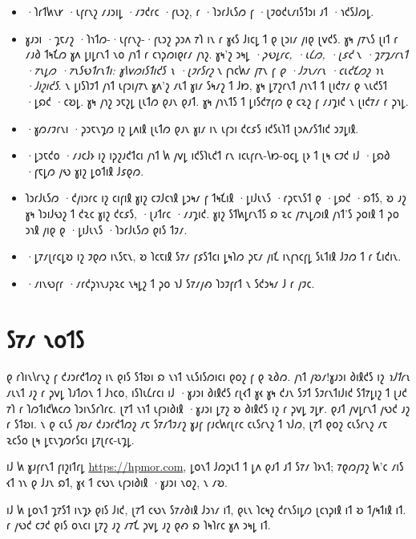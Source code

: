 \begin{itemize}
\item \textsc{·𐑐𐑩𐑑𐑿𐑯𐑾 ·𐑧𐑝𐑩𐑯𐑟} 𐑥𐑨𐑮𐑦𐑛 ·𐑥𐑲𐑒𐑩𐑤 ·𐑝𐑧𐑮𐑟, 𐑩 ·𐑐𐑮𐑩𐑓𐑧𐑕𐑼 𐑝 ·𐑚𐑲𐑴𐑒𐑧𐑥𐑦𐑕𐑑𐑮𐑦 𐑨𐑑 ·𐑪𐑒𐑕𐑓𐑼𐑛.
\item \textsc{𐑣𐑨𐑮𐑦 ·𐑡𐑱𐑥𐑟 ·𐑐𐑪𐑑𐑼-·𐑧𐑝𐑩𐑯𐑟-·𐑝𐑧𐑮𐑟} 𐑜𐑮𐑵 𐑳𐑐 𐑦𐑯 𐑩 𐑣𐑬𐑕 𐑓𐑦𐑤𐑛 𐑑 𐑞 𐑚𐑮𐑦𐑥 𐑢𐑦𐑞 𐑚𐑫𐑒𐑕. 𐑣𐑰 𐑢𐑳𐑯𐑕 𐑚𐑦𐑑 𐑩 𐑥𐑨𐑔 𐑑𐑰𐑗𐑼 𐑣𐑵 𐑛𐑦𐑛𐑩𐑯𐑑 𐑯𐑴 𐑢𐑪𐑑 𐑩 𐑤𐑪𐑜𐑼𐑦𐑞𐑩𐑥 𐑢𐑪𐑟. 𐑣𐑰'𐑟 𐑮𐑰𐑛 \emph{·𐑜𐑻︀𐑛𐑩𐑤, ·𐑧𐑖𐑼, ·𐑚𐑭𐑒} 𐑯 \emph{·𐑡𐑳𐑡𐑥𐑩𐑯𐑑 ·𐑳𐑯𐑛𐑼 ·𐑳𐑯𐑕𐑻𐑑𐑩𐑯𐑑𐑦: 𐑣𐑘𐑫𐑼𐑦𐑕𐑑𐑦𐑒𐑕 𐑯 ·𐑚𐑲𐑩𐑕𐑩𐑟} 𐑯 𐑝𐑪𐑤𐑿𐑥 𐑢𐑳𐑯 𐑝 \emph{𐑞 ·𐑓𐑲𐑯𐑥𐑩𐑯 ·𐑤𐑧𐑒𐑗𐑼𐑟 𐑪𐑯 ·𐑓𐑦𐑟𐑦𐑒𐑕}. 𐑯 𐑛𐑦𐑕𐑐𐑲𐑑 𐑢𐑪𐑑 𐑧𐑝𐑮𐑦𐑢𐑳𐑯 𐑣𐑵'𐑟 𐑥𐑧𐑑 𐑣𐑦𐑥 𐑕𐑰𐑥𐑟 𐑑 𐑓𐑽, 𐑣𐑰 𐑛𐑳𐑟𐑩𐑯𐑑 𐑢𐑪𐑯𐑑 𐑑 𐑚𐑦𐑒𐑳𐑥 𐑞 𐑯𐑧𐑒𐑕𐑑 ·𐑛𐑸𐑒 ·𐑤𐑹𐑛. 𐑣𐑰 𐑢𐑪𐑟 𐑮𐑱𐑟𐑛 𐑚𐑧𐑑𐑼 𐑞𐑨𐑯 𐑞𐑨𐑑. 𐑣𐑰 𐑢𐑪𐑯𐑑𐑕 𐑑 𐑛𐑦𐑕𐑒𐑳𐑝𐑼 𐑞 𐑤𐑷𐑟 𐑝 𐑥𐑨𐑡𐑦𐑒 𐑯 𐑚𐑦𐑒𐑳𐑥 𐑩 𐑜𐑪𐑛.
\item \textsc{·𐑣𐑼𐑥𐑲𐑩𐑯𐑦 ·𐑜𐑮𐑱𐑯𐑡𐑼} 𐑦𐑟 𐑛𐑵𐑦𐑙 𐑚𐑧𐑑𐑼 𐑞𐑨𐑯 𐑣𐑦𐑥 𐑦𐑯 𐑧𐑝𐑮𐑦 𐑒𐑤𐑭𐑕 𐑦𐑒𐑕𐑧𐑐𐑑 𐑚𐑮𐑵𐑥𐑕𐑑𐑦𐑒 𐑮𐑲𐑛𐑦𐑙.
\item \textsc{·𐑛𐑮𐑱𐑒𐑴 ·𐑥𐑨𐑤𐑓𐑶} 𐑦𐑟 𐑦𐑜𐑟𐑨𐑒𐑑𐑤𐑦 𐑢𐑪𐑑 𐑿 𐑢𐑫𐑛 𐑦𐑒𐑕𐑐𐑧𐑒𐑑 𐑩𐑯 𐑦𐑤𐑧𐑝𐑩𐑯-𐑘𐑽-𐑴𐑤𐑛 𐑚𐑶 𐑑 𐑚𐑰 𐑤𐑲𐑒 𐑦𐑓 ·𐑛𐑸𐑔 ·𐑝𐑱𐑛𐑼 𐑢𐑻 𐑣𐑦𐑟 𐑛𐑴𐑑𐑦𐑙 𐑓𐑭𐑞𐑼.
\item \textsc{𐑐𐑮𐑩𐑓𐑧𐑕𐑼 ·𐑒𐑢𐑦𐑮𐑩𐑤} 𐑦𐑟 𐑤𐑦𐑝𐑦𐑙 𐑣𐑦𐑟 𐑤𐑲𐑓𐑤𐑪𐑙 𐑛𐑮𐑰𐑥 𐑝 𐑑𐑰𐑗𐑦𐑙 ·𐑛𐑦𐑓𐑧𐑯𐑕 ·𐑩𐑜𐑱𐑯𐑕𐑑 𐑞 ·𐑛𐑸𐑒 ·𐑸𐑑𐑕, 𐑹 𐑨𐑟 𐑣𐑰 𐑐𐑮𐑦𐑓𐑻𐑟 𐑑 𐑒𐑷𐑤 𐑣𐑦𐑟 𐑒𐑤𐑭𐑕, ·𐑚𐑨𐑑𐑩𐑤 ·𐑥𐑨𐑡𐑦𐑒. 𐑣𐑦𐑟 𐑕𐑑𐑿𐑛𐑩𐑯𐑑𐑕 𐑸 𐑷𐑤 𐑢𐑳𐑯𐑛𐑼𐑦𐑙 𐑢𐑪𐑑'𐑕 𐑜𐑴𐑦𐑙 𐑑 𐑜𐑴 𐑮𐑪𐑙 𐑢𐑦𐑞 𐑞 ·𐑛𐑦𐑓𐑧𐑯𐑕 ·𐑐𐑮𐑩𐑓𐑧𐑕𐑼 𐑞𐑦𐑕 𐑑𐑲𐑥.
\item \textsc{·𐑛𐑳𐑥𐑚𐑩𐑤𐑛𐑹} 𐑦𐑟 𐑲𐑞𐑼 𐑦𐑯𐑕𐑱𐑯, 𐑹 𐑐𐑤𐑱𐑦𐑙 𐑕𐑳𐑥 𐑝𐑭𐑕𐑑𐑤𐑦 𐑛𐑰𐑐𐑼 𐑜𐑱𐑥 𐑢𐑦𐑗 𐑦𐑯𐑝𐑪𐑤𐑝𐑛 𐑕𐑧𐑑𐑦𐑙 𐑓𐑲𐑼 𐑑 𐑩 𐑗𐑦𐑒𐑦𐑯.
\item \textsc{·𐑥𐑦𐑯𐑻𐑝𐑩 ·𐑥𐑩𐑒𐑜𐑪𐑯𐑨𐑜𐑷𐑤} 𐑯𐑰𐑛𐑟 𐑑 𐑜𐑴 𐑪𐑓 𐑕𐑳𐑥𐑢𐑺 𐑐𐑮𐑲𐑝𐑩𐑑 𐑯 𐑕𐑒𐑮𐑰𐑥 𐑓 𐑩 𐑢𐑲𐑤.
\end{itemize}

%
%

\section*{𐑕𐑳𐑥 𐑯𐑴𐑑𐑕}
𐑞 𐑩𐑐𐑦𐑯𐑘𐑩𐑯𐑟 𐑝 𐑒𐑨𐑮𐑩𐑒𐑑𐑼𐑟 𐑦𐑯 𐑞𐑦𐑕 𐑕𐑑𐑹𐑦 𐑸 𐑯𐑪𐑑 𐑯𐑧𐑕𐑦𐑕𐑼𐑦𐑤𐑦 𐑞𐑴𐑟 𐑝 𐑞 𐑷𐑔𐑼. 𐑢𐑪𐑑 𐑢𐑹𐑥!𐑣𐑨𐑮𐑦 𐑔𐑦𐑙𐑒𐑕 𐑦𐑟 \emph{𐑪𐑓𐑑𐑩𐑯} 𐑥𐑧𐑯𐑑 𐑨𐑟 𐑩 𐑜𐑫𐑛 𐑐𐑨𐑑𐑼𐑯 𐑑 𐑓𐑪𐑤𐑴, 𐑦𐑕𐑐𐑧𐑖𐑩𐑤𐑦 𐑦𐑓 ·𐑣𐑨𐑮𐑦 𐑔𐑦𐑙𐑒𐑕 𐑩𐑚𐑬𐑑 𐑣𐑬 𐑣𐑰 𐑒𐑨𐑯 𐑕𐑲𐑑 𐑕𐑲𐑩𐑯𐑑𐑦𐑓𐑦𐑒 𐑕𐑑𐑳𐑛𐑦𐑟 𐑑 𐑚𐑨𐑒 𐑳𐑐 𐑩 𐑐𐑼𐑑𐑦𐑒𐑿𐑤𐑼 𐑐𐑮𐑦𐑯𐑕𐑩𐑐𐑩𐑤. 𐑚𐑳𐑑 𐑯𐑪𐑑 𐑧𐑝𐑮𐑦𐑔𐑦𐑙 ·𐑣𐑨𐑮𐑦 𐑛𐑳𐑟 𐑹 𐑔𐑦𐑙𐑒𐑕 𐑦𐑟 𐑩 𐑜𐑫𐑛 𐑲𐑛𐑾. 𐑞𐑨𐑑 𐑢𐑫𐑛𐑩𐑯𐑑 𐑢𐑻𐑒 𐑨𐑟 𐑩 𐑕𐑑𐑹𐑦. 𐑯 𐑞 𐑤𐑧𐑕 𐑢𐑹𐑥 𐑒𐑨𐑮𐑩𐑒𐑑𐑼𐑟 𐑥𐑱 𐑕𐑳𐑥𐑑𐑲𐑥𐑟 𐑣𐑨𐑝 𐑝𐑨𐑤𐑿𐑩𐑚𐑩𐑤 𐑤𐑧𐑕𐑩𐑯𐑟 𐑑 𐑪𐑓𐑼, 𐑚𐑳𐑑 𐑞𐑴𐑟 𐑤𐑧𐑕𐑩𐑯𐑟 𐑥𐑱 𐑷𐑤𐑕𐑴 𐑚𐑰 𐑛𐑱𐑯𐑡𐑼𐑩𐑕𐑤𐑦 𐑛𐑳𐑚𐑩𐑤-𐑧𐑡𐑛.

𐑦𐑓 𐑿 𐑣𐑨𐑝𐑩𐑯𐑑 𐑝𐑦𐑟𐑦𐑑𐑩𐑛 \url{https://hpmor.com}, 𐑛𐑴𐑯𐑑 𐑓𐑼𐑜𐑧𐑑 𐑑 𐑛𐑵 𐑞𐑨𐑑 𐑨𐑑 𐑕𐑳𐑥 𐑐𐑶𐑯𐑑; 𐑳𐑞𐑼𐑢𐑲𐑟 𐑿'𐑤 𐑥𐑦𐑕 𐑬𐑑 𐑪𐑯 𐑞 𐑓𐑨𐑯 𐑸𐑑, 𐑣𐑬 𐑑 𐑤𐑻𐑯 𐑧𐑝𐑮𐑦𐑔𐑦𐑙 ·𐑣𐑨𐑮𐑦 𐑯𐑴𐑟, 𐑯 𐑥𐑹.

𐑦𐑓 𐑿 𐑛𐑴𐑯𐑑 𐑡𐑳𐑕𐑑 𐑦𐑯𐑡𐑶 𐑞𐑦𐑕 𐑓𐑦𐑒, 𐑚𐑳𐑑 𐑤𐑻𐑯 𐑕𐑳𐑥𐑔𐑦𐑙 𐑓𐑮𐑪𐑥 𐑦𐑑, 𐑞𐑧𐑯 𐑐𐑤𐑰𐑟 𐑒𐑩𐑯𐑕𐑦𐑛𐑼 𐑚𐑤𐑪𐑜𐑦𐑙 𐑦𐑑 𐑹 𐑑𐑢𐑰𐑑𐑦𐑙 𐑦𐑑. 𐑩 𐑢𐑻𐑒 𐑤𐑲𐑒 𐑞𐑦𐑕 𐑴𐑯𐑤𐑦 𐑛𐑳𐑟 𐑨𐑟 𐑥𐑳𐑗 𐑜𐑫𐑛 𐑨𐑟 𐑞𐑺 𐑸 𐑐𐑰𐑐𐑩𐑤 𐑣𐑵 𐑮𐑰𐑛 𐑦𐑑.

